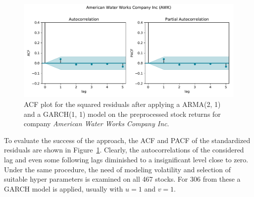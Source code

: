 \begin{figure}[!ht]
    \centering
    \includegraphics[width=\textwidth]{figures/regression/acf-awk-std-resid-sqr.pdf}
    \caption{ACF plot for the squared residuals after applying a ARMA(2, 1) and a GARCH(1, 1) model on the preprocessed stock returns for company \emph{American Water Works Company Inc}.}
    \label{fig:acf_pacf_awk_std_resid_sqr}
\end{figure}


To evaluate the success of the approach, the ACF and PACF of the standardized residuals are shown in Figure~\ref{fig:acf_pacf_awk_std_resid_sqr}. Clearly, the autocorrelations of the considered lag and even some following lags diminished to a insignificant level close to zero. Under the same procedure, the need of modeling volatility and selection of suitable hyper parameters is examined on all 467 stocks. For 306 from these a GARCH model is applied, usually with $u=1$ and $v=1$.






